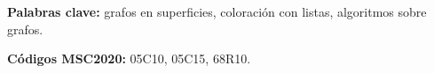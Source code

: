 \documentclass{report}
\theoremstyle{definition}
\begin{document}
\textbf{Palabras clave:} grafos en superficies, coloración con listas, algoritmos sobre grafos.

\textbf{Códigos MSC2020:} 05C10, 05C15, 68R10.

\newpage

\tableofcontents

\newpage













\newpage

\printbibliography
\end{document}
